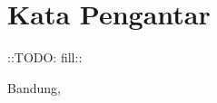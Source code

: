 \chapter*{Kata Pengantar}

::TODO: fill::

\begin{flushright}
  \vspace{0.5cm}
  Bandung, \tanggalpengesahan
  
  
  \vspace{1.5cm}
  
  \authorname
\end{flushright}